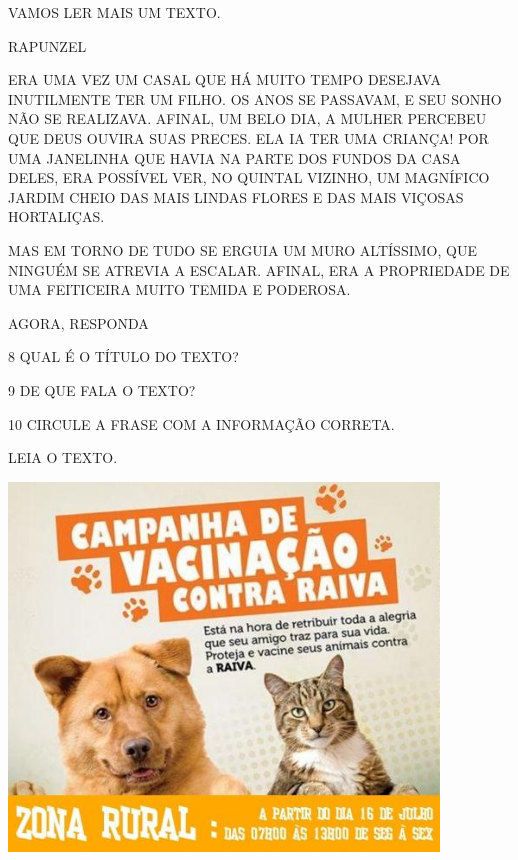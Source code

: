 VAMOS LER MAIS UM TEXTO.

RAPUNZEL

ERA UMA VEZ UM CASAL QUE HÁ MUITO TEMPO DESEJAVA INUTILMENTE TER UM
FILHO. OS ANOS SE PASSAVAM, E SEU SONHO NÃO SE REALIZAVA. AFINAL, UM
BELO DIA, A MULHER PERCEBEU QUE DEUS OUVIRA SUAS PRECES. ELA IA TER UMA
CRIANÇA! POR UMA JANELINHA QUE HAVIA NA PARTE DOS FUNDOS DA CASA DELES,
ERA POSSÍVEL VER, NO QUINTAL VIZINHO, UM MAGNÍFICO JARDIM CHEIO DAS MAIS
LINDAS FLORES E DAS MAIS VIÇOSAS HORTALIÇAS.

MAS EM TORNO DE TUDO SE ERGUIA UM MURO ALTÍSSIMO, QUE NINGUÉM SE ATREVIA
A ESCALAR. AFINAL, ERA A PROPRIEDADE DE UMA FEITICEIRA MUITO TEMIDA E
PODEROSA.


AGORA, RESPONDA

\num{8} QUAL É O TÍTULO DO TEXTO?


\num{9} DE QUE FALA O TEXTO?


\num{10} CIRCULE A FRASE COM A INFORMAÇÃO CORRETA.

%
%
%
%

LEIA O TEXTO.

\includegraphics[width=4.50249in,height=3.85413in]{media/image165.jpg}

